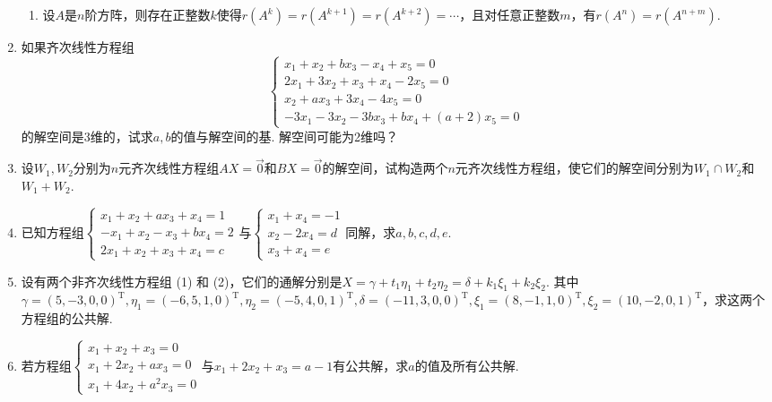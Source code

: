 \begin{enumerate}
\begin{enumerate}
              \item 设$A$是$n$阶方阵，则存在正整数$k$使得$r(A^k)=r(A^{k+1})=r(A^{k+2})=\cdots$，且对任意正整数$m$，有$r(A^n)=r(A^{n+m})$.
          \end{enumerate}

    \item 如果齐次线性方程组\[\begin{cases}
                  x_1+x_2+bx_3-x_4+x_5=0   \\
                  2x_1+3x_2+x_3+x_4-2x_5=0 \\
                  x_2+ax_3+3x_4-4x_5=0     \\
                  -3x_1-3x_2-3bx_3+bx_4+(a+2)x_5=0
              \end{cases}\]的解空间是3维的，试求$a,b$的值与解空间的基. 解空间可能为2维吗？

    \item 设$W_1,W_2$分别为$n$元齐次线性方程组$AX=\vec{0}$和$BX=\vec{0}$的解空间，试构造两个$n$元齐次线性方程组，使它们的解空间分别为$W_1 \cap W_2$和$W_1+W_2$.

    \item 已知方程组$\begin{cases}
                  x_1+x_2+ax_3+x_4=1 \\ -x_1+x_2-x_3+bx_4=2 \\ 2x_1+x_2+x_3+x_4=c
              \end{cases}$与$\begin{cases}
                  x_1+x_4=-1 \\ x_2-2x_4=d \\ x_3+x_4=e
              \end{cases}$同解，求$a,b,c,d,e$.

    \item 设有两个非齐次线性方程组 (1) 和 (2)，它们的通解分别是$X=\gamma+t_1\eta_1+t_2\eta_2=\delta+k_1\xi_1+k_2\xi_2$. 其中$\gamma=(5,-3,0,0)^\mathrm{T},\eta_1=(-6,5,1,0)^\mathrm{T},\eta_2=(-5,4,0,1)^\mathrm{T},\delta=(-11,3,0,0)^\mathrm{T},\xi_1=(8,-1,1,0)^\mathrm{T},\xi_2=(10,-2,0,1)^\mathrm{T}$，求这两个方程组的公共解.

    \item 若方程组$\begin{cases}
                  x_1+x_2+x_3=0   \\
                  x_1+2x_2+ax_3=0 \\
                  x_1+4x_2+a^2x_3=0
              \end{cases}$与$x_1+2x_2+x_3=a-1$有公共解，求$a$的值及所有公共解.
\end{enumerate}

